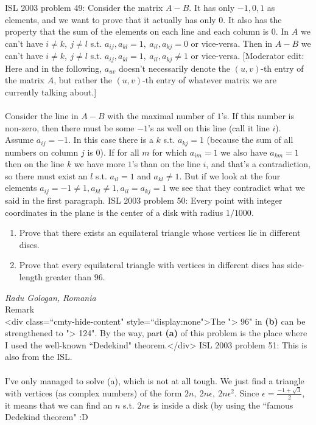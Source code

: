 ISL 2003 problem 49:  Consider the matrix $A-B$. It has only $-1,0,1$ as elements, and we want to prove that it actually has only $0$. It also has the property that the sum of the elements on each line and each column is $0$. In $A$ we can't have $i\ne k,\ j\ne l$ s.t. $a_{ij},a_{kl}=1,\ a_{il},a_{kj}=0$ or vice-versa. Then in $A-B$ we can't have $i\ne k,\ j\ne l$ s.t. $a_{ij},a_{kl}=1,\ a_{il},a_{kj}\ne 1$ or vice-versa. [Moderator edit: Here and in the following, $a_{uv}$ doesn't necessarily denote the $\left(u,v\right)$-th entry of the matrix $A$, but rather the $\left(u,v\right)$-th entry of whatever matrix we are currently talking about.] \\\\
Consider the line in $A-B$ with the maximal number of $1$'s. If this number is non-zero, then there must be some $-1$'s as well on this line (call it line $i$). Assume $a_{ij}=-1$. In this case there is a $k$ s.t. $a_{kj}=1$ (because the sum of all numbers on column $j$ is $0$). If for all $m$ for which $a_{im}=1$ we also have $a_{km}=1$ then on the line $k$ we have more $1$'s than on the line $i$, and that's a contradiction, so there must exist an $l$ s.t. $a_{il}=1$ and $a_{kl}\ne 1$. But if we look at the four elements $a_{ij}=-1\ne 1,a_{kl}\ne 1,a_{il}=a_{kj}=1$ we see that they contradict what we said in the first paragraph. 
ISL 2003 problem 50:  Every point with integer coordinates in the plane is the center of a disk with radius $1/1000$.
\begin{enumerate}[(1)]
  \item Prove that there exists an equilateral triangle whose vertices lie in different discs.
  \item Prove that every equilateral triangle with vertices in different discs has side-length greater than $96$.
\end{enumerate}
\textit{Radu Gologan, Romania} \\
Remark \\
<div class=``cmty-hide-content" style=``display:none">The "> 96" in \textbf{(b)} can be strengthened to "> 124". By the way, part \textbf{(a)} of this problem is the place where I used the well-known ``Dedekind" theorem.</div> 
ISL 2003 problem 51:  This is also from the ISL. \\\\
I've only managed to solve (a), which is not at all tough. We just find a triangle with vertices (as complex numbers) of the form $2n,\ 2n\epsilon,\ 2n\epsilon^2$. Since $\epsilon=\frac{-1+\sqrt3}2$, it means that we can find an $n$ s.t. $2n\epsilon$ is inside a disk (by using the ``famous Dedekind theorem" :D 
